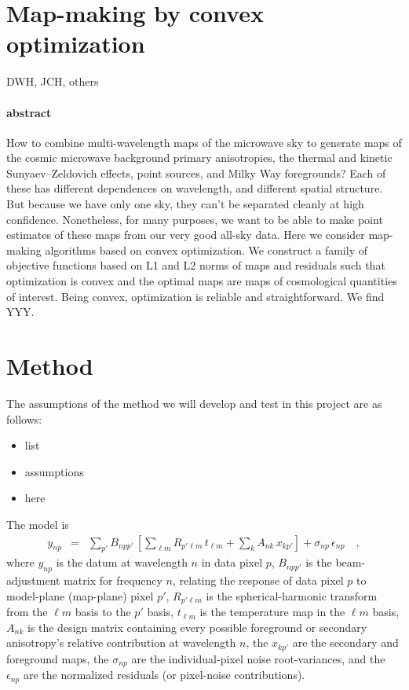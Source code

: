 \documentclass[11pt]{article}
\begin{document}
\section*{Map-making by convex optimization}

\noindent
DWH, JCH, others

\paragraph{abstract}
How to combine multi-wavelength maps of the microwave sky to generate
maps of the cosmic microwave background primary anisotropies, the
thermal and kinetic Sunyaev--Zeldovich effects, point sources, and
Milky Way foregrounds?
Each of these has different dependences on wavelength, and different
spatial structure.
But because we have only one sky, they can't be separated cleanly at
high confidence.
Nonetheless, for many purposes, we want to be able to make point
estimates of these maps from our very good all-sky data.
Here we consider map-making algorithms based on convex optimization.
We construct a family of objective functions based on L1 and L2 norms
of maps and residuals such that optimization is convex and the optimal
maps are maps of cosmological quantities of interest.
Being convex, optimization is reliable and straightforward.
We find YYY.

\section{Method}

The assumptions of the method we will develop and test in this project
are as follows:
\begin{itemize}\itemsep=0ex
\item list
\item assumptions
\item here
\end{itemize}

The model is
\begin{eqnarray}
  y_{np} &=& \sum_{p'} B_{npp'}\,\left[
      \sum_{\ell m} R_{p'\ell m}\,t_{\ell m}
    + \sum_{k} A_{nk}\,x_{kp'}\right] + \sigma_{np}\,\epsilon_{np} \quad ,
\end{eqnarray}
where $y_{np}$ is the datum at wavelength $n$ in data pixel $p$,
$B_{npp'}$ is the beam-adjust\-ment matrix for frequency $n$, relating the response of data
pixel $p$ to model-plane (map-plane) pixel $p'$, $R_{p'\ell m}$ is the
spherical-harmonic transform from the $\ell m$ basis to the $p'$
basis, $t_{\ell m}$ is the temperature map in the $\ell m$ basis,
$A_{nk}$ is the design matrix containing every possible foreground or
secondary anisotropy's relative contribution at wavelength $n$, the
$x_{kp'}$ are the secondary and foreground maps, the $\sigma_{np}$ are
the individual-pixel noise root-variances, and the $\epsilon_{np}$ are
the normalized residuals (or pixel-noise contributions).
\end{document}
